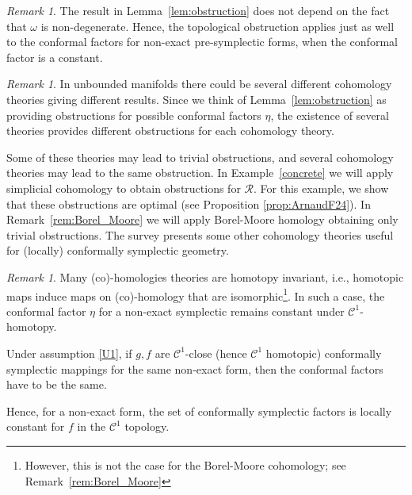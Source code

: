 \documentclass[11pt]{amsart}
\theoremstyle{definition}
\theoremstyle{remark}
\newtheorem{rem}[thm]{Remark}
\numberwithin{equation}{section}
\newcommand{\C}{\mathcal{C}}
\begin{document}
\begin{rem}
\label{presymplectic_obstruction}
The result in Lemma~\ref{lem:obstruction} does
not depend on  the fact that $\omega$ is non-degenerate.
Hence,  the topological obstruction applies
just as well to the conformal factors for
non-exact pre-symplectic forms,
when the conformal factor is  a constant.
\end{rem}



\begin{rem}
  \label{several}
  In unbounded manifolds there could be several different cohomology theories giving different results.
  Since we think of  Lemma~\ref{lem:obstruction} as providing obstructions for possible conformal factors $\eta$, the existence of several theories   provides different obstructions for each cohomology theory.

  Some of these theories may lead to trivial obstructions,
  and several cohomology theories may lead to the same obstruction.
  In  Example~\ref{concrete} we will apply simplicial cohomology
  to obtain  obstructions for $\mathcal{R}$. For this example, we show that these obstructions
  are optimal  (see Proposition \ref{prop:ArnaudF24}). In Remark~\ref{rem:Borel_Moore} we will apply Borel-Moore homology
obtaining only trivial obstructions. The survey \cite{BanyagaHS24}
presents some other cohomology theories
useful for (locally) conformally symplectic geometry.
\end{rem}


\begin{rem}
  \label{rem:locallyconstant}
  Many (co)-homologies theories are homotopy invariant,  i.e., homotopic maps induce  maps on  (co)-homology that are isomorphic\footnote{However, this is not the case for the Borel-Moore cohomology; see Remark~\ref{rem:Borel_Moore}}.
  In such a case, the  conformal factor $\eta$ for a non-exact
  symplectic  remains
  constant under $\C^1$-homotopy.

  Under assumption \eqref{U1}, if $g,f$ are $\C^1$-close
  (hence $\C^1$ homotopic) conformally
  symplectic mappings for the same non-exact form,
  then the conformal factors have to be the same.


  Hence, for a non-exact form, the set of conformally symplectic factors is locally
  constant for $f$ in the $\C^1$ topology.
\end{rem}
\end{document}
